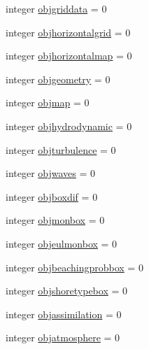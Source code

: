 \begin{DoxyCompactItemize}
\item 
integer \mbox{\hyperlink{structmodulelagrangianglobal_1_1t__eulermodel_a54b61cda1120b7be2b32a73bb6018f2c}{objgriddata}} = 0
\item 
integer \mbox{\hyperlink{structmodulelagrangianglobal_1_1t__eulermodel_a834f66a02e184fdcf2be702678d2639f}{objhorizontalgrid}} = 0
\item 
integer \mbox{\hyperlink{structmodulelagrangianglobal_1_1t__eulermodel_a0867ef8d80dd8f4bf38944efedc90baf}{objhorizontalmap}} = 0
\item 
integer \mbox{\hyperlink{structmodulelagrangianglobal_1_1t__eulermodel_aef283850b6a2772ef03b7d3a9301925a}{objgeometry}} = 0
\item 
integer \mbox{\hyperlink{structmodulelagrangianglobal_1_1t__eulermodel_aa37808cc1daf21e26be23bcd4aafd68e}{objmap}} = 0
\item 
integer \mbox{\hyperlink{structmodulelagrangianglobal_1_1t__eulermodel_a609d586b8e298b2513d89a53ee3ce6eb}{objhydrodynamic}} = 0
\item 
integer \mbox{\hyperlink{structmodulelagrangianglobal_1_1t__eulermodel_a07a6fbc79b21385a0725a08b7319c809}{objturbulence}} = 0
\item 
integer \mbox{\hyperlink{structmodulelagrangianglobal_1_1t__eulermodel_a948ef5fbc0d0ea3361b7e24f8559d2b3}{objwaves}} = 0
\item 
integer \mbox{\hyperlink{structmodulelagrangianglobal_1_1t__eulermodel_a6a69a9cc466bcdc10e1dd965743b95ed}{objboxdif}} = 0
\item 
integer \mbox{\hyperlink{structmodulelagrangianglobal_1_1t__eulermodel_a6a97155d0ee2a02878b6fcbb56d11aa9}{objmonbox}} = 0
\item 
integer \mbox{\hyperlink{structmodulelagrangianglobal_1_1t__eulermodel_ab5d4b0a98ed6ff59b7c9df818c786988}{objeulmonbox}} = 0
\item 
integer \mbox{\hyperlink{structmodulelagrangianglobal_1_1t__eulermodel_accbb31f9f7fce75c6b4cc4aeced59065}{objbeachingprobbox}} = 0
\item 
integer \mbox{\hyperlink{structmodulelagrangianglobal_1_1t__eulermodel_a92bfa7027823143274235925270fe2a6}{objshoretypebox}} = 0
\item 
integer \mbox{\hyperlink{structmodulelagrangianglobal_1_1t__eulermodel_a5781cf3627b575ccda08833502c079e3}{objassimilation}} = 0
\item 
integer \mbox{\hyperlink{structmodulelagrangianglobal_1_1t__eulermodel_a0d2e6007c8f657536c65cd3151829904}{objatmosphere}} = 0
\item 

\end{DoxyCompactItemize}
